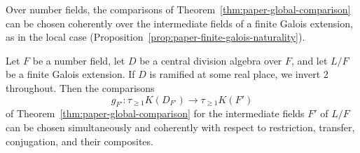 Over number fields, the comparisons of Theorem~\ref{thm:paper-global-comparison} can be chosen coherently over the intermediate fields of a finite Galois extension, as in the local case (Proposition~\ref{prop:paper-finite-galois-naturality}).

\begin{proposition}\label{prop:paper-finite-galois-naturality-global}
Let $F$ be a number field, let $D$ be a central division algebra over $F$, and let $L/F$ be a finite Galois extension.
If $D$ is ramified at some real place, we invert $2$ throughout.
Then the comparisons
\[
 g_{F'}\colon\tau_{\ge1}K(D_{F'})\longrightarrow\tau_{\ge1}K(F')
\]
of Theorem~\ref{thm:paper-global-comparison} for the intermediate fields $F'$ of $L/F$ can be chosen simultaneously and coherently with respect to restriction, transfer, conjugation, and their composites.
\end{proposition}
